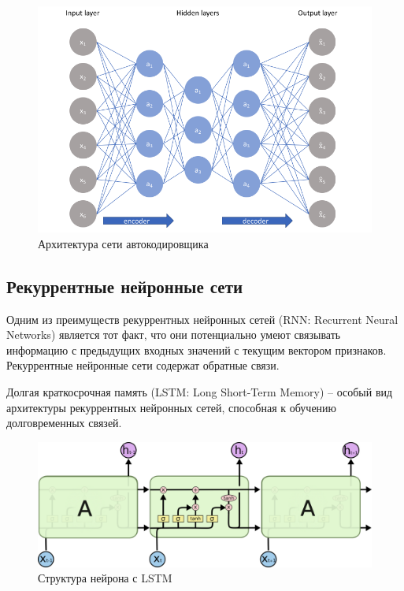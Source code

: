 \documentclass[12pt]{article}
\begin{document}
    \begin{figure}[h!]
        \centering
        \includegraphics[width=0.9\linewidth]{autoencoder.png}
        \caption{Архитектура сети автокодировщика}
        \label{sec:Future:autoencoder:fig:autoencoder}
    \end{figure}


    \subsection{Рекуррентные нейронные сети}
    \label{sec:Future:LSTM}

    \par Одним из преимуществ рекуррентных нейронных сетей (RNN: Recurrent Neural Networks) является тот факт, что они потенциально умеют связывать информацию с предыдущих входных значений с текущим вектором признаков. Рекуррентные нейронные сети содержат обратные связи.

    \par Долгая краткосрочная память (LSTM: Long Short-Term Memory) \cite{LSTM} – особый вид архитектуры рекуррентных нейронных сетей, способная к обучению долговременных связей.

    \begin{figure}[h!]
        \centering
        \includegraphics[width=0.9\linewidth]{LSTM.png}
        \caption{Структура нейрона с LSTM}
        \label{sec:Future:LSTM:fig:LSTM}
    \end{figure}
\end{document}
